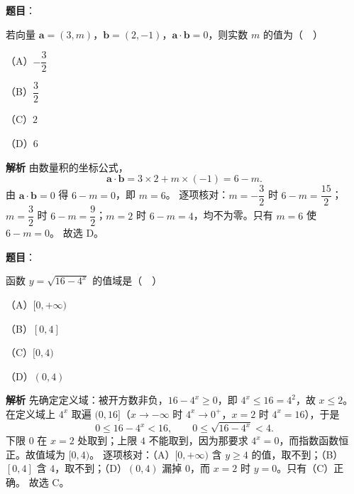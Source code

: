 \begin{answer}

\textbf{题目}：

若向量 $\boldsymbol a=(3,m)$，$\boldsymbol b=(2,-1)$，$\boldsymbol a\cdot\boldsymbol b=0$，则实数 $m$ 的值为（　）

（A）$-\dfrac32$

（B）$\dfrac32$

（C）$2$

（D）$6$

\textbf{解析}
由数量积的坐标公式，
\nopagebreak[4]
\[\boldsymbol a\cdot\boldsymbol b=3\times2+m\times(-1)=6-m.\]
由 $\boldsymbol a\cdot\boldsymbol b=0$ 得 $6-m=0$，即 $m=6$。
逐项核对：$m=-\dfrac32$ 时 $6-m=\dfrac{15}{2}$；$m=\dfrac32$ 时 $6-m=\dfrac92$；$m=2$ 时 $6-m=4$，均不为零。只有 $m=6$ 使 $6-m=0$。
故选 D。


\end{answer}
\begin{answer}

\textbf{题目}：

函数 $y=\sqrt{16-4^x}$ 的值域是（　）

（A）$[0,+\infty)$

（B）$[0,4]$

（C）$[0,4)$

（D）$(0,4)$

\textbf{解析}
先确定定义域：被开方数非负，$16-4^x\geqslant0$，即 $4^x\leqslant16=4^2$，故 $x\leqslant2$。
在定义域上 $4^x$ 取遍 $(0,16]$（$x\to-\infty$ 时 $4^x\to0^+$，$x=2$ 时 $4^x=16$），于是
\nopagebreak[4]
\[0\leqslant16-4^x<16,\qquad 0\leqslant\sqrt{16-4^x}<4.\]
下限 $0$ 在 $x=2$ 处取到；上限 $4$ 不能取到，因为那要求 $4^x=0$，而指数函数恒正。故值域为 $[0,4)$。
逐项核对：（A）$[0,+\infty)$ 含 $y\geqslant4$ 的值，取不到；（B）$[0,4]$ 含 $4$，取不到；（D）$(0,4)$ 漏掉 $0$，而 $x=2$ 时 $y=0$。只有（C）正确。
故选 C。


\end{answer}
